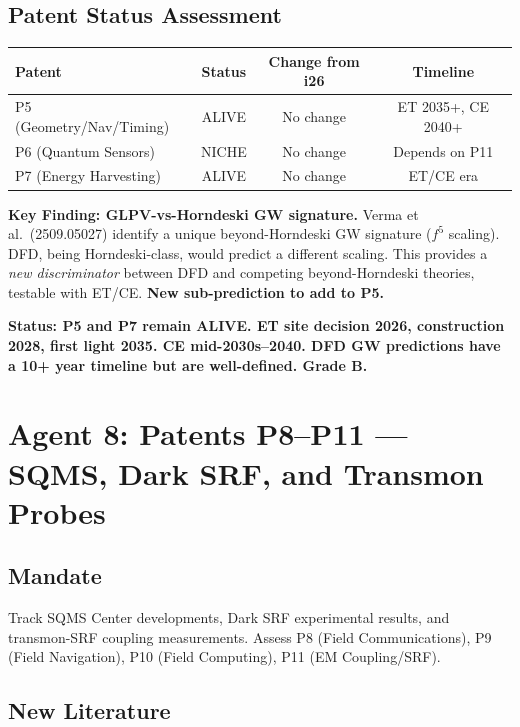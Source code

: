 \documentclass[11pt,a4paper]{article}
\begin{document}
\subsection{Patent Status Assessment}

\begin{center}
\begin{tabular}{lccc}
\toprule
\textbf{Patent} & \textbf{Status} & \textbf{Change from i26} & \textbf{Timeline} \\
\midrule
P5 (Geometry/Nav/Timing) & ALIVE & No change & ET 2035+, CE 2040+ \\
P6 (Quantum Sensors) & NICHE & No change & Depends on P11 \\
P7 (Energy Harvesting) & ALIVE & No change & ET/CE era \\
\bottomrule
\end{tabular}
\end{center}

\textbf{Key Finding: GLPV-vs-Horndeski GW signature.} Verma et al.\ (2509.05027) identify a unique beyond-Horndeski GW signature ($f^5$ scaling). DFD, being Horndeski-class, would predict a different scaling. This provides a \emph{new discriminator} between DFD and competing beyond-Horndeski theories, testable with ET/CE. \textbf{New sub-prediction to add to P5.}

\textbf{Status: P5 and P7 remain ALIVE. ET site decision 2026, construction 2028, first light 2035. CE mid-2030s--2040. DFD GW predictions have a 10+ year timeline but are well-defined. Grade B.}

\section{Agent 8: Patents P8--P11 --- SQMS, Dark SRF, and Transmon Probes}

\subsection{Mandate}
Track SQMS Center developments, Dark SRF experimental results, and transmon-SRF coupling measurements. Assess P8 (Field Communications), P9 (Field Navigation), P10 (Field Computing), P11 (EM Coupling/SRF).

\subsection{New Literature}
\end{document}
